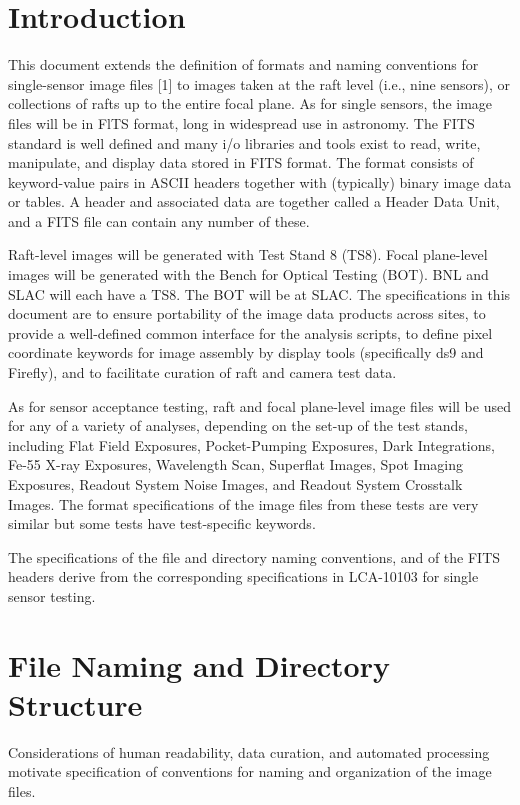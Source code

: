 \documentclass{article}[12pt]
\begin{document}

\section{Introduction}
This document extends the definition of formats and naming conventions for single-sensor image files [1] to images taken at the raft level (i.e., nine sensors), or collections of rafts up to the entire focal plane.  As for single sensors, the image files will be in FlTS format, long in widespread use in astronomy.  The FITS standard is well defined and many i/o libraries and tools exist to read, write, manipulate, and display data stored in FITS format.  The format consists of keyword-value pairs in ASCII headers together with (typically) binary image data or tables.  A header and associated data are together called a Header Data Unit, and a FITS file can contain any number of these.

Raft-level images will be generated with Test Stand 8 (TS8).  Focal plane-level images will be generated with the Bench for Optical Testing (BOT).  BNL and SLAC will each have a TS8.  The BOT will be at SLAC.  The specifications in this document are to ensure portability of the image data products across sites, to provide a well-defined common interface for the analysis scripts, to define pixel coordinate keywords for image assembly by display tools (specifically ds9 and Firefly), and to facilitate curation of raft and camera test data.

As for sensor acceptance testing, raft and focal plane-level image files will be used for any of a variety of analyses, depending on the set-up of the test stands, including Flat Field Exposures, Pocket-Pumping Exposures, Dark Integrations, Fe-55 X-ray Exposures, Wavelength Scan, Superflat Images, Spot Imaging Exposures, Readout System Noise Images, and Readout System Crosstalk Images.
The format specifications of the image files from these tests are very similar but some tests have test-specific keywords.  

The specifications of the file and directory naming conventions, and of the FITS headers derive from the corresponding specifications in LCA-10103 for single sensor testing.

\section{File Naming and Directory Structure}
Considerations of human readability, data curation, and automated processing motivate specification of conventions for naming and organization of the image files.
\end{document}
